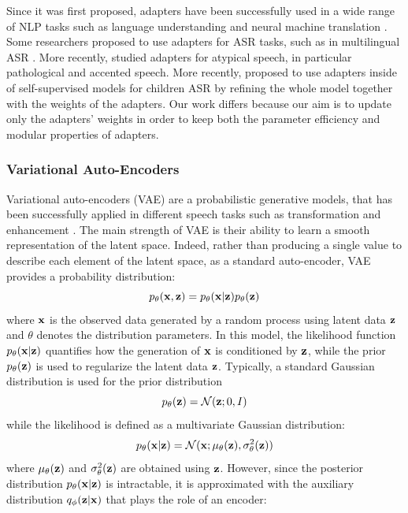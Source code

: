 Since it was first proposed, adapters have been successfully used in a wide range of NLP tasks such as language understanding \cite{pfeiffer} and neural machine translation \cite{philip2020monolingual}. Some researchers proposed to use adapters for ASR tasks, such as in multilingual ASR \cite{kannan2019large}. More recently, \cite{tomanek2021residual} studied adapters for atypical speech, in particular pathological and accented speech. More recently, \cite{fan2022draft} proposed to use adapters inside of self-supervised models for children ASR by refining the whole model together with the weights of the adapters. Our work differs because our aim is to update only the adapters' weights in order to keep both the parameter efficiency and modular properties of adapters.

\subsubsection{Variational Auto-Encoders}
Variational auto-encoders (VAE) \cite{VAE} are a probabilistic generative models, that has been successfully applied in different speech tasks such as transformation \cite{vae_transformation} and enhancement \cite{vae_enh}. The main strength of VAE is their ability to learn a smooth representation of the latent space. Indeed, rather than producing a single value to describe each element of the latent space, as a standard auto-encoder, VAE provides a probability distribution: 
\begin{equation}
    p_{\theta}(\vb{x},\vb{z}) =  p_{\theta}(\vb{x}|\vb{z}) p_{\theta}(\vb{z})
\end{equation}
where $\vb{x}$ is the observed data generated by a random process using latent data $\vb{z}$ and $\theta$ denotes the distribution parameters. In this model, the likelihood function $ p_{\theta}(\vb{x}|\vb{z})$ quantifies   how the generation of $\vb{x}$ is conditioned by $\vb{z}$, while the prior $p_{\theta}(\vb{z})$ is used to regularize the latent data $\vb{z}$. Typically, a standard Gaussian distribution is used for the prior distribution
\begin{equation}
    p_{\theta}(\vb{z}) = \mathcal{N}(\vb{z}; 0, I)
\end{equation}
while the likelihood is defined as a multivariate Gaussian distribution:
\begin{equation}
     p_{\theta}(\vb{x}|\vb{z}) = \mathcal{N}(\vb{x}; \mu_{\theta}(\vb{z}), \sigma^2_{\theta}(\vb{z}))
\end{equation}
where $\mu_{\theta}(\vb{z})$ and $\sigma^2_{\theta}(\vb{z})$ are obtained using $\vb{z}$. However, since the posterior distribution $p_{\theta}(\vb{x}| \vb{z})$ is intractable, it is approximated with the auxiliary distribution $q_{\phi}(\vb{z}| \vb{x})$ that plays the role of an encoder:

